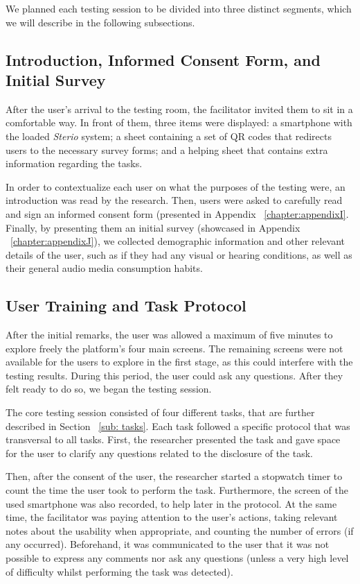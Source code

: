 We planned each testing session to be divided into three distinct segments, which we will describe in the following subsections.

\subsection{Introduction, Informed Consent Form, and Initial Survey}

After the user's arrival to the testing room, the facilitator invited them to sit in a comfortable way. In front of them, three items were displayed: a smartphone with the loaded \textit{Sterio} system; a sheet containing a set of QR codes that redirects users to the necessary survey forms; and a helping sheet that contains extra information regarding the tasks.

In order to contextualize each user on what the purposes of the testing were, an introduction was read by the research. Then, users were asked to carefully read and sign an informed consent form (presented in Appendix ~\ref{chapter:appendixI}. Finally, by presenting them an initial survey (showcased in Appendix ~\ref{chapter:appendixJ}), we collected demographic information and other relevant details of the user, such as if they had any visual or hearing conditions, as well as their general audio media consumption habits.

\subsection{User Training and Task Protocol}
\label{subsub:taskprot}

After the initial remarks, the user was allowed a maximum of five minutes to explore freely the platform's four main screens. The remaining screens were not available for the users to explore in the first stage, as this could interfere with the testing results. During this period, the user could ask any questions. After they felt ready to do so, we began the testing session.

The core testing session consisted of four different tasks, that are further described in Section ~\ref{sub: tasks}. Each task followed a specific protocol that was transversal to all tasks. First, the researcher presented the task and gave space for the user to clarify any questions related to the disclosure of the task.

Then, after the consent of the user, the researcher started a stopwatch timer to count the time the user took to perform the task. Furthermore, the screen of the used smartphone was also recorded, to help later in the protocol. At the same time, the facilitator was paying attention to the user's actions, taking relevant notes about the usability when appropriate, and counting the number of errors (if any occurred). Beforehand, it was communicated to the user that it was not possible to express any comments nor ask any questions (unless a very high level of difficulty whilst performing the task was detected).

